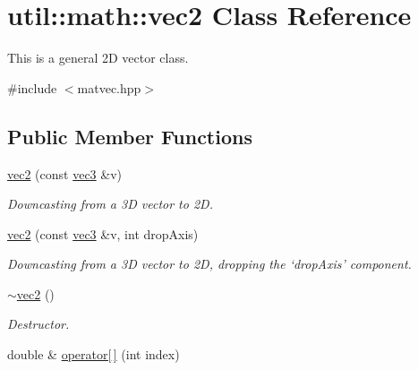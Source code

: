 \hypertarget{classutil_1_1math_1_1vec2}{\section{util\-:\-:math\-:\-:vec2 \-Class \-Reference}
\label{classutil_1_1math_1_1vec2}
}


\-This is a general 2\-D vector class.  




{\ttfamily \#include $<$matvec.\-hpp$>$}

\subsection*{\-Public \-Member \-Functions}
\begin{DoxyCompactItemize}
\item 
\hypertarget{classutil_1_1math_1_1vec2_af368a5df5d0de984e45879db971b1d04}{\hyperlink{classutil_1_1math_1_1vec2_af368a5df5d0de984e45879db971b1d04}{vec2} (const \hyperlink{classutil_1_1math_1_1vec3}{vec3} \&v)}\label{classutil_1_1math_1_1vec2_af368a5df5d0de984e45879db971b1d04}

\begin{DoxyCompactList}\small\item\em \-Downcasting from a 3\-D vector to 2\-D. \end{DoxyCompactList}\item 
\hypertarget{classutil_1_1math_1_1vec2_a6f53edc9e89672d0164d8428a023d772}{\hyperlink{classutil_1_1math_1_1vec2_a6f53edc9e89672d0164d8428a023d772}{vec2} (const \hyperlink{classutil_1_1math_1_1vec3}{vec3} \&v, int drop\-Axis)}\label{classutil_1_1math_1_1vec2_a6f53edc9e89672d0164d8428a023d772}

\begin{DoxyCompactList}\small\item\em \-Downcasting from a 3\-D vector to 2\-D, dropping the `drop\-Axis' component. \end{DoxyCompactList}\item 
\hypertarget{classutil_1_1math_1_1vec2_a2b4006cca4db9c4353d2bda6a6d18f44}{\hyperlink{classutil_1_1math_1_1vec2_a2b4006cca4db9c4353d2bda6a6d18f44}{$\sim$vec2} ()}\label{classutil_1_1math_1_1vec2_a2b4006cca4db9c4353d2bda6a6d18f44}

\begin{DoxyCompactList}\small\item\em \-Destructor. \end{DoxyCompactList}\item 
\hypertarget{classutil_1_1math_1_1vec2_a2ab5b563ceb76bc4d89349483ed50266}{double \& \hyperlink{classutil_1_1math_1_1vec2_a2ab5b563ceb76bc4d89349483ed50266}{operator\mbox{[}$\,$\mbox{]}} (int index)}\label{classutil_1_1math_1_1vec2_a2ab5b563ceb76bc4d89349483ed50266}


\end{DoxyCompactItemize}
